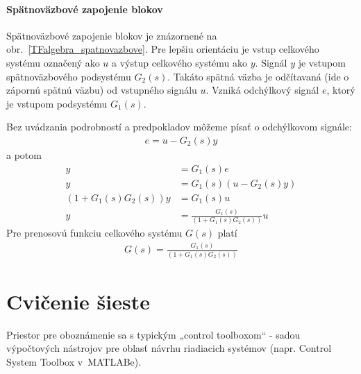 \documentclass[a4paper, 10pt, ]{article}
\begin{document}
\paragraph{Spätnoväzbové zapojenie blokov}

Spätnoväzbové zapojenie blokov je znázornené na obr.~\ref{TFalgebra_spatnovazbove}. Pre lepšiu orientáciu je vstup celkového systému označený ako $u$ a výstup celkového systému ako $y$. Signál $y$ je vstupom spätnoväzbového podsystému $G_2(s)$. Takáto spätná väzba je odčítavaná (ide o zápornú spätnú väzbu) od vstupného signálu $u$. Vzniká odchýlkový signál $e$, ktorý je vstupom podsystému $G_1(s)$.


\begin{center}

    \makebox[\textwidth][c]{%
    
    }

	\label{TFalgebra_spatnovazbove}

\end{center}

Bez uvádzania podrobností a predpokladov môžeme písať o odchýlkovom signále:
\begin{align}
    e = u - G_2(s) y
\end{align}
a potom
\begin{subequations}
    \begin{align}
        y &= G_1(s) e \\
        y &= G_1(s) \left( u - G_2(s) y \right) \\
        \left( 1 + G_1(s)G_2(s) \right) y &= G_1(s) u  \\
        y &= \frac{G_1(s)}{\left( 1 + G_1(s)G_2(s) \right)} u
    \end{align}
\end{subequations}
Pre prenosovú funkciu celkového systému $G(s)$ platí
\begin{align}
   G(s) = \frac{G_1(s)}{\left( 1 + G_1(s)G_2(s) \right)}
\end{align}









\section{Cvičenie šieste}

Priestor pre oboznámenie sa s typickým „control toolboxom“ - sadou výpočtových nástrojov pre oblasť návrhu riadiacich systémov (napr. Control System Toolbox v~MATLABe).
\end{document}
